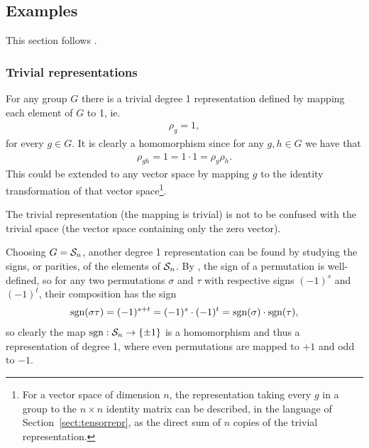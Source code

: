 \subsection{Examples}\label{sect:basicreprs}

This section follows \cite[1.2]{Serre}.

\subsubsection{Trivial representations}


\begin{example}\label{example:trivrepr}
	For any group $G$ there is a trivial degree 1 representation defined by mapping each element of $G$ to 1, ie.
	\begin{align*}
		\rho_g = 1,
	\end{align*}
	for every $g \in G$. It is clearly a homomorphism since for any $g,h \in G$ we have that
	\begin{align*}
		\rho_{gh} = 1 = 1 \cdot 1 = \rho_g \rho_h.
	\end{align*}
	This could be extended to any vector space by mapping $g$ to the identity transformation of that vector space\footnote{For a vector space of dimension $n$, the representation taking every $g$ in a group to the $n \times n$ identity matrix can be described, in the language of Section~\ref{sect:tensorrepr}, as the direct sum of $n$ copies of the trivial representation.}.
\end{example}

\begin{note}
	The trivial representation (the mapping is trivial) is not to be confused with the trivial space (the vector space containing only the zero vector).
\end{note}

\begin{example}\label{example:altrepr}
	Choosing $G = \mathcal{S}_n$, another degree 1 representation can be found by studying the signs, or parities, of the elements of $\mathcal{S}_n$. By \cite[Thm.12.6.1.]{Biggs}, the sign of a permutation is well-defined, so for any two permutations $\sigma$ and $\tau$ with respective signs $(-1)^s$ and $(-1)^t$, their composition has the sign
	\begin{align*}
		\text{sgn}(\sigma\tau) = (-1)^{s+t} = (-1)^s \cdot (-1)^t = \text{sgn} (\sigma) \cdot \text{sgn} (\tau),
	\end{align*}
	so clearly the map $\text{sgn}: \mathcal{S}_n \rightarrow \{\pm 1\}$ is a homomorphism and thus a representation of degree 1, where even permutations are mapped to $+1$ and odd to $-1$.
\end{example}

